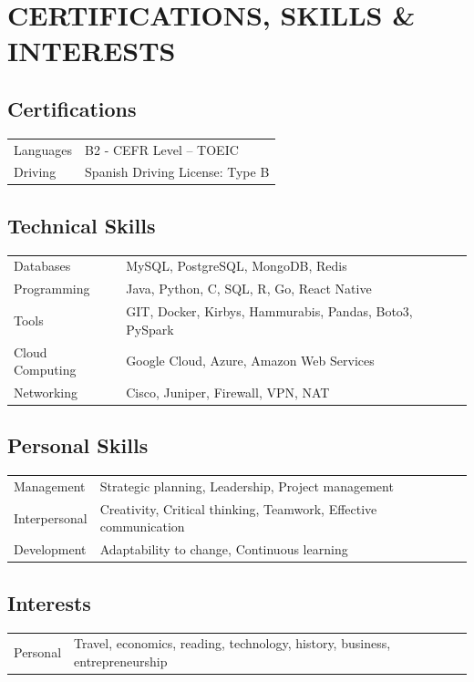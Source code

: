 \documentclass[a4paper,10pt]{article}
\begin{document}
	\section{CERTIFICATIONS, SKILLS \& INTERESTS}
	
	\subsection*{Certifications}
	\begin{tabularx}{\linewidth}{@{}l X@{}}
		Languages & B2 - CEFR Level – TOEIC \\
		Driving & Spanish Driving License: Type B \\
	\end{tabularx}
	
	\subsection*{Technical Skills}
	\begin{tabularx}{\linewidth}{@{}l X@{}}
		Databases & MySQL, PostgreSQL, MongoDB, Redis \\
		Programming & Java, Python, C, SQL, R, Go, React Native \\
		Tools & GIT, Docker, Kirbys, Hammurabis, Pandas, Boto3, PySpark \\
		Cloud Computing & Google Cloud, Azure, Amazon Web Services \\
		Networking & Cisco, Juniper, Firewall, VPN, NAT \\
	\end{tabularx}
	
	\subsection*{Personal Skills}
	\begin{tabularx}{\linewidth}{@{}l X@{}}
		Management & Strategic planning, Leadership, Project management \\
		Interpersonal & Creativity, Critical thinking, Teamwork, Effective communication \\
		Development & Adaptability to change, Continuous learning \\
	\end{tabularx}
	
	\subsection*{Interests}
	\begin{tabularx}{\linewidth}{@{}l X@{}}
		Personal & Travel, economics, reading, technology, history, business, entrepreneurship \\
	\end{tabularx}
	
	\vfill
	
\end{document}
